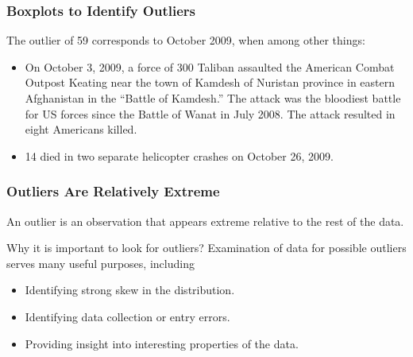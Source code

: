 \documentclass[handout]{beamer}
\newcommand{\blue}[1]{\textcolor{blue2}{#1}}
\begin{document}
\begin{frame}
\frametitle{Boxplots to Identify Outliers}
The outlier of 59 corresponds to October 2009, when among other things:
\begin{itemize}
\pause\item On October 3, 2009, a force of 300 Taliban assaulted the American Combat Outpost Keating near the town of Kamdesh of Nuristan province in eastern Afghanistan in the ``Battle of Kamdesh.'' \pause The attack was the bloodiest battle for US forces since the Battle of Wanat in July 2008. The attack resulted in eight Americans killed.
\pause\item 14 died in two separate helicopter crashes on October 26, 2009.
\end{itemize}

\end{frame}






\begin{frame}
\frametitle{Outliers Are Relatively Extreme}
An \blue{outlier} is an observation that appears extreme relative to the rest of the data.

\vspace{0.5cm}

\pause Why it is important to look for outliers?  Examination of data for possible outliers serves many useful purposes, including
\begin{itemize}
\pause\item Identifying strong skew in the distribution.
\pause\item Identifying data collection or entry errors.
\pause\item Providing insight into interesting properties of the data.
\end{itemize}

\end{frame}




\end{document}
